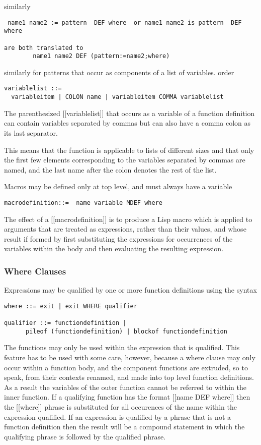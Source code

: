 \documentclass{article}
\begin{document}
similarly
\begin{verbatim}  
 name1 name2 := pattern  DEF where  or name1 name2 is pattern  DEF where
 
are both translated to
        name1 name2 DEF (pattern:=name2;where)
\end{verbatim}  

similarly for patterns that occur as components of a list of
variables. order
\begin{verbatim} 
variablelist ::=
  variableitem | COLON name | variableitem COMMA variablelist
\end{verbatim} 

The parenthesized [[variablelist]] that occurs as a variable of a function
definition can contain variables separated by commas but can also
have a comma colon as its last separator.
 
This means that the function is applicable to lists of different
sizes and that only the first few elements corresponding to the
variables separated by commas are named, and
the last name after the colon denotes the rest of the list.
 
Macros may be defined only at top level, and must always have a variable
\begin{verbatim}  
macrodefinition::=  name variable MDEF where
\end{verbatim} 

The effect of a [[macrodefinition]] is to produce a Lisp macro
which is applied to arguments that are treated as expressions, rather
than their values, and whose result if formed by first substituting
the expressions for occurrences of the variables within the body
and then evaluating the resulting expression.
 
\subsubsection{Where Clauses}
\label{sec:boot:where-clause}
 
Expressions may be qualified by one or more function definitions
using the syntax
\begin{verbatim}  
where ::= exit | exit WHERE qualifier
 
qualifier ::= functiondefinition |
      pileof (functiondefinition) | blockof functiondefinition
\end{verbatim} 

The functions may only be used within the expression that is qualified.
This feature has to be used with some care, however, because
a where clause may only occur within a function body, and
the component functions are extruded, so to speak, from their contexts
renamed, and made into top level function definitions.
As a result the variables of the outer function cannot be referred to
within the inner function.
If a qualifying function has the format [[name DEF where]] then
the [[where]] phrase is substituted for all occurences of the name
within the expression qualified.
If an expression is qualified by a phrase that is not a
function definition then the result will be a compound statement
in which the qualifying phrase is followed by the qualified phrase.
 
\end{document}
